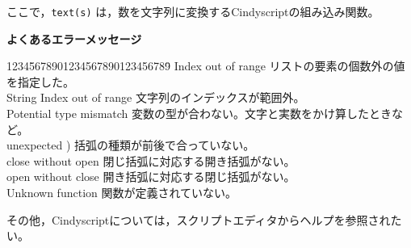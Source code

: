 \documentclass[papersize,a4paper,12pt,uplatex]{jsarticle}
\begin{document}
ここで，\verb|text(s)| は，数を文字列に変換するCindyscriptの組み込み関数。

\vspace{\baselineskip}\noindent
{\bf よくあるエラーメッセージ}
\begin{tabbing}
1234\=5678901234567890123456789\=\kill
 \>Index out of range \>リストの要素の個数外の値を指定した。\\
 \>String Index out of range \>文字列のインデックスが範囲外。\\
 \>Potential type mismatch \>変数の型が合わない。文字と実数をかけ算したときなど。\\
 \>unexpected ) \>括弧の種類が前後で合っていない。\\
 \>close  without open \>閉じ括弧に対応する開き括弧がない。\\
 \>open  without close \>開き括弧に対応する閉じ括弧がない。\\
 \>Unknown function \>関数が定義されていない。
\end{tabbing}


\vspace{\baselineskip}
その他，Cindyscriptについては，スクリプトエディタからヘルプを参照されたい。
\end{document}
